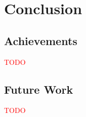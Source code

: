 \chapter{Conclusion}
\label{chap:conclusion}

\section{Achievements}
\textcolor{red}{TODO}

\section{Future Work}
\textcolor{red}{TODO}